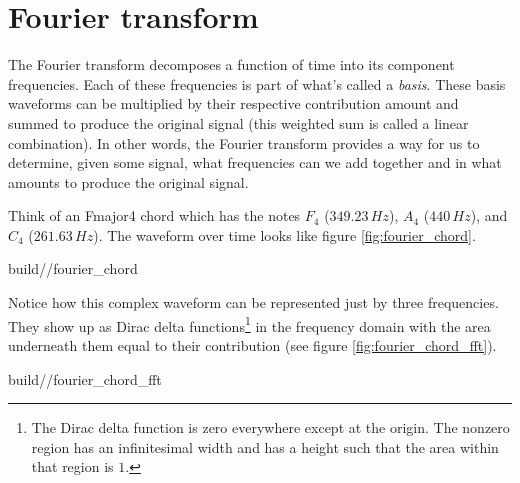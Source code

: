 \section{Fourier transform}

The Fourier transform decomposes a function of time into its component
frequencies. Each of these frequencies is part of what's called a
\textit{basis}. These basis waveforms can be multiplied by their respective
contribution amount and summed to produce the original signal (this weighted sum
is called a linear combination). In other words, the Fourier transform provides
a way for us to determine, given some signal, what frequencies can we add
together and in what amounts to produce the original signal.

Think of an Fmajor4 chord which has the notes $F_4$ ($349.23\,Hz$), $A_4$
($440\,Hz$), and $C_4$ ($261.63\,Hz$). The waveform over time looks like figure
\ref{fig:fourier_chord}.
\begin{svg}{build/\chapterpath/fourier_chord}
  \caption{Frequency decomposition of Fmajor4 chord}
  \label{fig:fourier_chord}
\end{svg}

Notice how this complex waveform can be represented just by three frequencies.
They show up as Dirac delta functions\footnote{The Dirac delta function is zero
everywhere except at the origin. The nonzero region has an infinitesimal width
and has a height such that the area within that region is $1$.} in the frequency
domain with the area underneath them equal to their contribution (see figure
\ref{fig:fourier_chord_fft}).
\begin{svg}{build/\chapterpath/fourier_chord_fft}
  \caption{Fourier transform of Fmajor4 chord}
  \label{fig:fourier_chord_fft}
\end{svg}
